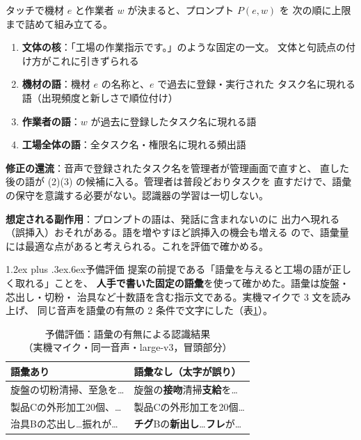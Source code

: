 \documentclass[a4paper,10pt,twocolumn]{ltjsarticle}
\makeatletter
\renewcommand{\section}{\@startsection{section}{1}{\z@}%
  {1.2ex plus .3ex}{.6ex}{\normalfont\normalsize\bfseries\sffamily}}
\makeatother
\begin{document}
タッチで機材 $e$ と作業者 $w$ が決まると、プロンプト $P(e,w)$ を
次の順に上限まで詰めて組み立てる。
\begin{enumerate}[label=(\arabic*)]
\item \textbf{文体の核}：「工場の作業指示です。」のような固定の一文。
  文体と句読点の付け方がこれに引きずられる
\item \textbf{機材の語}：機材 $e$ の名称と、$e$ で過去に登録・実行された
  タスク名に現れる語（出現頻度と新しさで順位付け）
\item \textbf{作業者の語}：$w$ が過去に登録したタスク名に現れる語
\item \textbf{工場全体の語}：全タスク名・権限名に現れる頻出語
\end{enumerate}
\textbf{修正の還流}：音声で登録されたタスク名を管理者が管理画面で直すと、
直した後の語が (2)(3) の候補に入る。管理者は普段どおりタスクを
直すだけで、語彙の保守を意識する必要がない。認識器の学習は一切しない。

\textbf{想定される副作用}：プロンプトの語は、発話に含まれないのに
出力へ現れる（誤挿入）おそれがある。語を増やすほど誤挿入の機会も増える
ので、語彙量には最適な点があると考えられる。これを評価で確かめる。

\section{予備評価}
提案の前提である「語彙を与えると工場の語が正しく取れる」ことを、
\textbf{人手で書いた固定の語彙}を使って確かめた。語彙は旋盤・芯出し・切粉・
治具など十数語を含む指示文である。実機マイクで 3 文を読み上げ、
同じ音声を語彙の有無の 2 条件で文字にした（表\ref{tab:prompt}）。

\begin{table}[t]
\centering\footnotesize
\caption{予備評価：語彙の有無による認識結果\\（実機マイク・同一音声・large-v3，冒頭部分）}\label{tab:prompt}
\begin{tabular}{@{}ll@{}}
\toprule
語彙あり & 語彙なし（太字が誤り） \\
\midrule
旋盤の切粉清掃、至急を… & 旋盤の\textbf{接吻}清掃\textbf{支給}を… \\
製品Cの外形加工20個、… & 製品Cの外形加工を20個… \\
治具Bの芯出し…振れが… & \textbf{チグ}Bの\textbf{新出し}…\textbf{フレ}が… \\
\bottomrule
\end{tabular}
\end{table}
\end{document}
